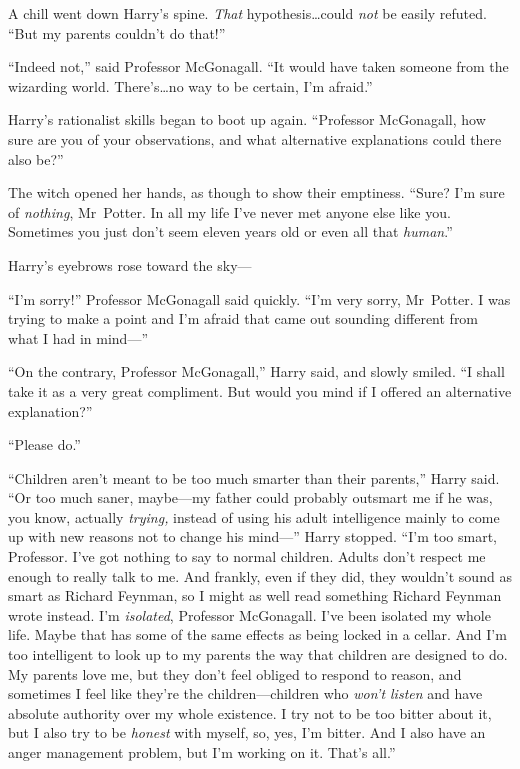 A chill went down Harry’s spine. \emph{That} hypothesis…could \emph{not} be easily refuted. “But my parents couldn’t do that!”

“Indeed not,” said Professor McGonagall. “It would have taken someone from the wizarding world. There’s…no way to be certain, I’m afraid.”

Harry’s rationalist skills began to boot up again. “Professor McGonagall, how sure are you of your observations, and what alternative explanations could there also be?”

The witch opened her hands, as though to show their emptiness. “Sure? I’m sure of \emph{nothing}, Mr~Potter. In all my life I’ve never met anyone else like you. Sometimes you just don’t seem eleven years old or even all that \emph{human}.”

Harry’s eyebrows rose toward the sky—

“I’m sorry!” Professor McGonagall said quickly. “I’m very sorry, Mr~Potter. I was trying to make a point and I’m afraid that came out sounding different from what I had in mind—”

“On the contrary, Professor McGonagall,” Harry said, and slowly smiled. “I shall take it as a very great compliment. But would you mind if I offered an alternative explanation?”

“Please do.”

“Children aren’t meant to be too much smarter than their parents,” Harry said. “Or too much saner, maybe—my father could probably outsmart me if he was, you know, actually \emph{trying,} instead of using his adult intelligence mainly to come up with new reasons not to change his mind—” Harry stopped. “I’m too smart, Professor. I’ve got nothing to say to normal children. Adults don’t respect me enough to really talk to me. And frankly, even if they did, they wouldn’t sound as smart as Richard Feynman, so I might as well read something Richard Feynman wrote instead. I’m \emph{isolated}, Professor McGonagall. I’ve been isolated my whole life. Maybe that has some of the same effects as being locked in a cellar. And I’m too intelligent to look up to my parents the way that children are designed to do. My parents love me, but they don’t feel obliged to respond to reason, and sometimes I feel like they’re the children—children who \emph{won’t listen} and have absolute authority over my whole existence. I try not to be too bitter about it, but I also try to be \emph{honest} with myself, so, yes, I’m bitter. And I also have an anger management problem, but I’m working on it. That’s all.”

